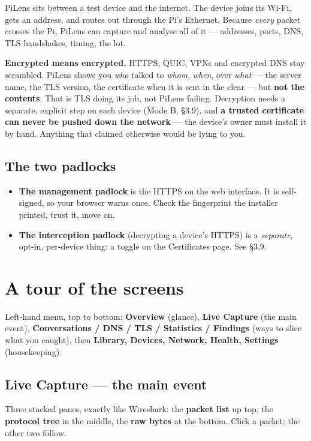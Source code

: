\documentclass[11pt]{article}
\begin{document}
PiLens sits between a test device and the internet. The device joins its Wi-Fi,
gets an address, and routes out through the Pi's Ethernet. Because \emph{every}
packet crosses the Pi, PiLens can capture and analyse all of it --- addresses,
ports, DNS, TLS handshakes, timing, the lot.

\begin{truth}
\textbf{Encrypted means encrypted.} HTTPS, QUIC, VPNs and encrypted DNS stay
scrambled. PiLens shows you \emph{who} talked to \emph{whom}, \emph{when}, over
\emph{what} --- the server name, the TLS version, the certificate when it is sent
in the clear --- but \textbf{not the contents}. That is TLS doing its job, not
PiLens failing. Decryption needs a separate, explicit step on each device (Mode B, \S3.9), and \textbf{a trusted certificate can never be pushed down the
network} --- the device's owner must install it by hand. Anything that claimed
otherwise would be lying to you.
\end{truth}

\subsection{The two padlocks}
\begin{itemize}[leftmargin=1.4em, itemsep=1pt]
  \item \textbf{The management padlock} is the HTTPS on the web interface. It is
    self-signed, so your browser warns once. Check the fingerprint the installer
    printed, trust it, move on.
  \item \textbf{The interception padlock} (decrypting a device's HTTPS) is a
    \emph{separate}, opt-in, per-device thing: a toggle on the Certificates page.
    See \S3.9.
\end{itemize}

\section{A tour of the screens}
\begin{tldr}
Left-hand menu, top to bottom: \textbf{Overview} (glance), \textbf{Live Capture}
(the main event), \textbf{Conversations / DNS / TLS / Statistics / Findings}
(ways to slice what you caught), then \textbf{Library, Devices, Network, Health,
Settings} (housekeeping).
\end{tldr}

\subsection{Live Capture --- the main event}
\begin{tldr}
Three stacked panes, exactly like Wireshark: the \textbf{packet list} up top, the
\textbf{protocol tree} in the middle, the \textbf{raw bytes} at the bottom. Click a
packet; the other two follow.
\end{tldr}
\end{document}
